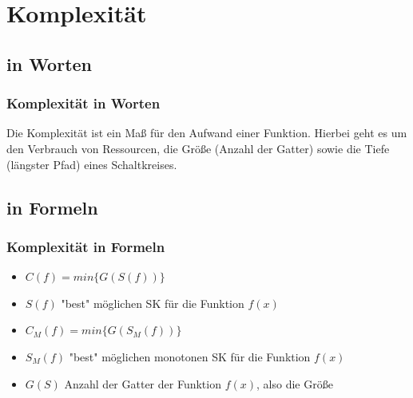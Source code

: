 \documentclass[hyperref={pdfpagelabels=false}]{beamer} %
\begin{document}
\section{Komplexität}
\subsection*{in Worten}
\begin{frame}%
 \frametitle{Komplexität in Worten}
Die Komplexität ist ein Maß für den Aufwand einer Funktion.
Hierbei geht es um den Verbrauch von Ressourcen, die Größe (Anzahl der Gatter) sowie die Tiefe (längster Pfad)
eines Schaltkreises.\\
\end{frame}

\subsection*{in Formeln}
\begin{frame}
 \frametitle{Komplexität in Formeln}
\begin{itemize}
 \item $C(f) = min \{G(S(f))\}$
 \item $S(f)$ "best" möglichen SK für die Funktion $f(x)$
 \item $C_M(f) = min \{G(S_M(f))\}$
 \item $S_M(f)$ "best" möglichen monotonen SK für die Funktion $f(x)$
 \item $G(S)$ Anzahl der Gatter der Funktion $f(x)$, also die Größe
\end{itemize}
%
\end{frame}
\end{document}

